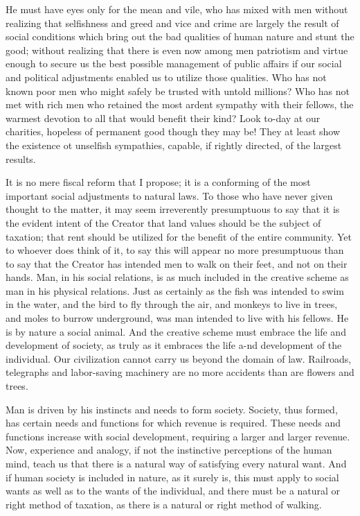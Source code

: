 \documentclass{book}
\begin{document}
He must have eyes only for the mean and vile, who has mixed with men without realizing that selfishness and greed and vice and crime are largely the result of social conditions which bring out the bad qualities of human nature and stunt the good; without realizing that there is even now among men patriotism and virtue enough to secure us the best possible management of public affairs if our social and political adjustments enabled us to utilize those qualities. Who has not known poor men who might safely be trusted with untold millions? Who has not met with rich men who retained the most ardent sympathy with their fellows, the warmest devotion to all that would benefit their kind? Look to-day at our charities, hopeless of permanent good though they may be! They at least show the existence ot unselfish sympathies, capable, if rightly directed, of the largest results.

It is no mere fiscal reform that I propose; it is a conforming of the most important social adjustments to natural laws. To those who have never given thought to the matter, it may seem irreverently presumptuous to say that it is the evident intent of the Creator that land values should be the subject of taxation; that rent should be utilized for the benefit of the entire community. Yet to whoever does think of it, to say this will appear no more presumptuous than to say that the Creator has intended men to walk on their feet, and not on their hands. Man, in his social relations, is as much included in the creative scheme as man in his physical relations. Just as certainly as the fish was intended to swim in the water, and the bird to fly through the air, and monkeys to live in trees, and moles to burrow underground, was man intended to live with his fellows. He is by nature a social animal. And the creative scheme must embrace the life and development of society, as truly as it embraces the life a-nd development of the individual. Our civilization cannot carry us beyond the domain of law. Railroads, telegraphs and labor-saving machinery are no more accidents than are flowers and trees.

Man is driven by his instincts and needs to form society. Society, thus formed, has certain needs and functions for which revenue is required. These needs and functions increase with social development, requiring a larger and larger revenue. Now, experience and analogy, if not the instinctive perceptions of the human mind, teach us that there is a natural way of satisfying every natural want. And if human society is included in nature, as it surely is, this must apply to social wants as well as to the wants of the individual, and there must be a natural or right method of taxation, as there is a natural or right method of walking.
\end{document}
